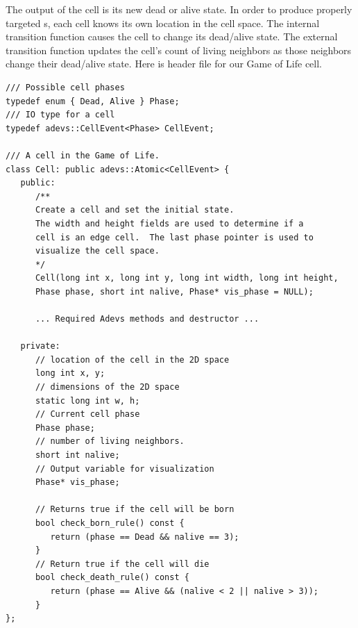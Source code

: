 The output of the cell is its new dead or alive state. In order to produce properly targeted s, each cell knows its own location in the cell space. The internal transition function causes the cell to change its dead/alive state. The external transition function updates the cell's count of living neighbors as those neighbors change their dead/alive state. Here is header file for our Game of Life cell.
\begin{verbatim}
/// Possible cell phases
typedef enum { Dead, Alive } Phase;
/// IO type for a cell
typedef adevs::CellEvent<Phase> CellEvent;

/// A cell in the Game of Life.
class Cell: public adevs::Atomic<CellEvent> {
   public:
      /**
      Create a cell and set the initial state.
      The width and height fields are used to determine if a
      cell is an edge cell.  The last phase pointer is used to
      visualize the cell space.
      */
      Cell(long int x, long int y, long int width, long int height,
      Phase phase, short int nalive, Phase* vis_phase = NULL);

      ... Required Adevs methods and destructor ...

   private:
      // location of the cell in the 2D space
      long int x, y;
      // dimensions of the 2D space
      static long int w, h;
      // Current cell phase
      Phase phase;
      // number of living neighbors.
      short int nalive;
      // Output variable for visualization
      Phase* vis_phase;

      // Returns true if the cell will be born
      bool check_born_rule() const {
         return (phase == Dead && nalive == 3);
      }
      // Return true if the cell will die
      bool check_death_rule() const {
         return (phase == Alive && (nalive < 2 || nalive > 3));
      }
};
\end{verbatim}

